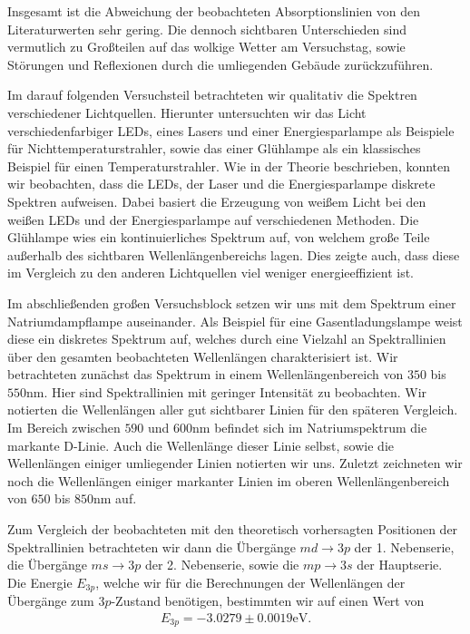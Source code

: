 Insgesamt ist die Abweichung der beobachteten Absorptionslinien von den Literaturwerten sehr gering. Die dennoch sichtbaren Unterschieden sind vermutlich zu Großteilen auf das wolkige Wetter am Versuchstag, sowie Störungen und Reflexionen durch die umliegenden Gebäude zurückzuführen.

Im darauf folgenden Versuchsteil betrachteten wir qualitativ die Spektren verschiedener Lichtquellen. Hierunter untersuchten wir das Licht verschiedenfarbiger LEDs, eines Lasers und einer Energiesparlampe als Beispiele für Nichttemperaturstrahler, sowie das einer Glühlampe als ein klassisches Beispiel für einen Temperaturstrahler. Wie in der Theorie beschrieben, konnten wir beobachten, dass die LEDs, der Laser und die Energiesparlampe diskrete Spektren aufweisen. Dabei basiert die Erzeugung von weißem Licht bei den weißen LEDs und der Energiesparlampe auf verschiedenen Methoden. Die Glühlampe wies ein kontinuierliches Spektrum auf, von welchem große Teile außerhalb des sichtbaren Wellenlängenbereichs lagen. Dies zeigte auch, dass diese im Vergleich zu den anderen Lichtquellen viel weniger energieeffizient ist.

Im abschließenden großen Versuchsblock setzen wir uns mit dem Spektrum einer Natriumdampflampe auseinander. Als Beispiel für eine Gasentladungslampe weist diese ein diskretes Spektrum auf, welches durch eine Vielzahl an Spektrallinien über den gesamten beobachteten Wellenlängen charakterisiert ist. Wir betrachteten zunächst das Spektrum in einem Wellenlängenbereich von $350$ bis $550\si{\nano\meter}$. Hier sind Spektrallinien mit geringer Intensität zu beobachten. Wir notierten die Wellenlängen aller gut sichtbarer Linien für den späteren Vergleich. Im Bereich zwischen $590$ und $600\si{\nano\meter}$ befindet sich im Natriumspektrum die markante D-Linie. Auch die Wellenlänge dieser Linie selbst, sowie die Wellenlängen einiger umliegender Linien notierten wir uns. Zuletzt zeichneten wir noch die Wellenlängen einiger markanter Linien im oberen Wellenlängenbereich von $650$ bis $850\si{\nano\meter}$ auf.

Zum Vergleich der beobachteten mit den theoretisch vorhersagten Positionen der Spektrallinien betrachteten wir dann die Übergänge $md \to 3p$ der 1. Nebenserie, die Übergänge $ms \to 3p$ der 2. Nebenserie, sowie die $mp \to 3s$ der Hauptserie. Die Energie $E_{3p}$, welche wir für die Berechnungen der Wellenlängen der Übergänge zum $3p$-Zustand benötigen, bestimmten wir auf einen Wert von
\begin{align}
  E_{3p} = -3.0279 \pm 0.0019\si{\electronvolt}.
\end{align}

